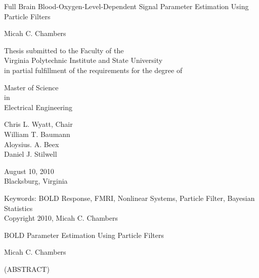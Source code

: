 \documentclass[12pt]{report}
\numberwithin{algorithm}{chapter}
\begin{document}
\thispagestyle{empty}
\begin{center}

{\Large 
Full Brain Blood-Oxygen-Level-Dependent Signal Parameter Estimation Using Particle Filters
}

\vfill

Micah C. Chambers

\vfill

Thesis submitted to the Faculty of the \\
Virginia Polytechnic Institute and State University \\
in partial fulfillment of the requirements for the degree of

\vfill

Master of Science \\
in \\
Electrical Engineering

\vfill

Chris L. Wyatt, Chair \\
William T. Baumann\\
Aloysius. A. Beex \\
Daniel J. Stilwell

\vfill

August 10, 2010\\
Blacksburg, Virginia

\vfill

Keywords: BOLD Response, FMRI, Nonlinear Systems, Particle Filter, Bayesian Statistics
\\
Copyright 2010, Micah C. Chambers

\end{center}

\pagebreak

\thispagestyle{empty}
\begin{center}

{\large BOLD Parameter Estimation Using Particle 
Filters }

\vfill

Micah C. Chambers

\vfill

(ABSTRACT)

\vfill

\end{center}
\end{document}
